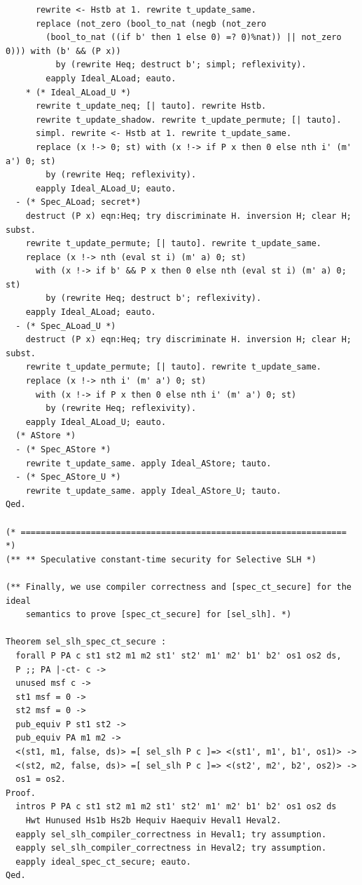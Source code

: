 \documentclass[12pt]{report}
\begin{document}
\begin{verbatim}
      rewrite <- Hstb at 1. rewrite t_update_same.
      replace (not_zero (bool_to_nat (negb (not_zero
        (bool_to_nat ((if b' then 1 else 0) =? 0)%nat)) || not_zero 0))) with (b' && (P x))
          by (rewrite Heq; destruct b'; simpl; reflexivity).
        eapply Ideal_ALoad; eauto.
    * (* Ideal_ALoad_U *)
      rewrite t_update_neq; [| tauto]. rewrite Hstb.
      rewrite t_update_shadow. rewrite t_update_permute; [| tauto].
      simpl. rewrite <- Hstb at 1. rewrite t_update_same.
      replace (x !-> 0; st) with (x !-> if P x then 0 else nth i' (m' a') 0; st)
        by (rewrite Heq; reflexivity).
      eapply Ideal_ALoad_U; eauto.
  - (* Spec_ALoad; secret*)
    destruct (P x) eqn:Heq; try discriminate H. inversion H; clear H; subst.
    rewrite t_update_permute; [| tauto]. rewrite t_update_same.
    replace (x !-> nth (eval st i) (m' a) 0; st)
      with (x !-> if b' && P x then 0 else nth (eval st i) (m' a) 0; st)
        by (rewrite Heq; destruct b'; reflexivity).
    eapply Ideal_ALoad; eauto.
  - (* Spec_ALoad_U *)
    destruct (P x) eqn:Heq; try discriminate H. inversion H; clear H; subst.
    rewrite t_update_permute; [| tauto]. rewrite t_update_same.
    replace (x !-> nth i' (m' a') 0; st)
      with (x !-> if P x then 0 else nth i' (m' a') 0; st)
        by (rewrite Heq; reflexivity).
    eapply Ideal_ALoad_U; eauto.
  (* AStore *)
  - (* Spec_AStore *)
    rewrite t_update_same. apply Ideal_AStore; tauto.
  - (* Spec_AStore_U *)
    rewrite t_update_same. apply Ideal_AStore_U; tauto.
Qed.

(* ================================================================= *)
(** ** Speculative constant-time security for Selective SLH *)

(** Finally, we use compiler correctness and [spec_ct_secure] for the ideal
    semantics to prove [spec_ct_secure] for [sel_slh]. *)

Theorem sel_slh_spec_ct_secure :
  forall P PA c st1 st2 m1 m2 st1' st2' m1' m2' b1' b2' os1 os2 ds,
  P ;; PA |-ct- c ->
  unused msf c ->
  st1 msf = 0 ->
  st2 msf = 0 ->
  pub_equiv P st1 st2 ->
  pub_equiv PA m1 m2 ->
  <(st1, m1, false, ds)> =[ sel_slh P c ]=> <(st1', m1', b1', os1)> ->
  <(st2, m2, false, ds)> =[ sel_slh P c ]=> <(st2', m2', b2', os2)> ->
  os1 = os2.
Proof.
  intros P PA c st1 st2 m1 m2 st1' st2' m1' m2' b1' b2' os1 os2 ds
    Hwt Hunused Hs1b Hs2b Hequiv Haequiv Heval1 Heval2.
  eapply sel_slh_compiler_correctness in Heval1; try assumption.
  eapply sel_slh_compiler_correctness in Heval2; try assumption.
  eapply ideal_spec_ct_secure; eauto.
Qed.


\end{verbatim}
\end{document}
